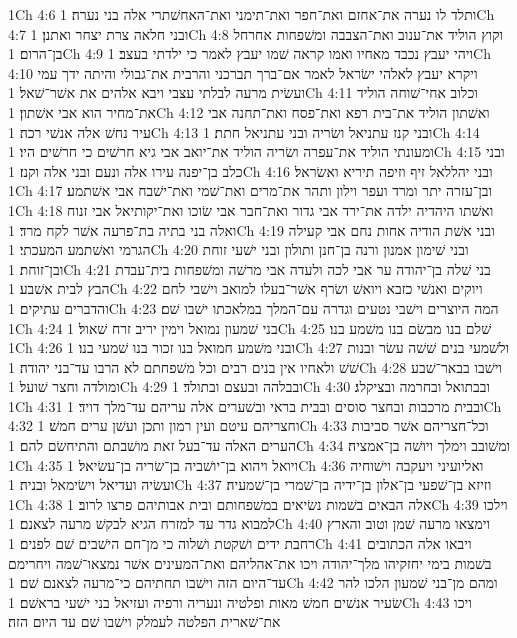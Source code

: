 1Ch 4:6  ותלד לו נערה את־אחזם ואת־חפר ואת־תימני ואת־האחשׁתרי אלה בני נערה׃
1Ch 4:7  ובני חלאה צרת יצחר ואתנן׃
1Ch 4:8  וקוץ הוליד את־ענוב ואת־הצבבה ומשׁפחות אחרחל בן־הרום׃
1Ch 4:9  ויהי יעבץ נכבד מאחיו ואמו קראה שׁמו יעבץ לאמר כי ילדתי בעצב׃
1Ch 4:10  ויקרא יעבץ לאלהי ישׂראל לאמר אם־ברך תברכני והרבית את־גבולי והיתה ידך עמי ועשׂית מרעה לבלתי עצבי ויבא אלהים את אשׁר־שׁאל׃
1Ch 4:11  וכלוב אחי־שׁוחה הוליד את־מחיר הוא אבי אשׁתון׃
1Ch 4:12  ואשׁתון הוליד את־בית רפא ואת־פסח ואת־תחנה אבי עיר נחשׁ אלה אנשׁי רכה׃
1Ch 4:13  ובני קנז עתניאל ושׂריה ובני עתניאל חתת׃
1Ch 4:14  ומעונתי הוליד את־עפרה ושׂריה הוליד את־יואב אבי גיא חרשׁים כי חרשׁים היו׃
1Ch 4:15  ובני כלב בן־יפנה עירו אלה ונעם ובני אלה וקנז׃
1Ch 4:16  ובני יהללאל זיף וזיפה תיריא ואשׂראל׃
1Ch 4:17  ובן־עזרה יתר ומרד ועפר וילון ותהר את־מרים ואת־שׁמי ואת־ישׁבח אבי אשׁתמע׃
1Ch 4:18  ואשׁתו היהדיה ילדה את־ירד אבי גדור ואת־חבר אבי שׂוכו ואת־יקותיאל אבי זנוח ואלה בני בתיה בת־פרעה אשׁר לקח מרד׃
1Ch 4:19  ובני אשׁת הודיה אחות נחם אבי קעילה הגרמי ואשׁתמע המעכתי׃
1Ch 4:20  ובני שׁימון אמנון ורנה בן־חנן ותולון ובני ישׁעי זוחת ובן־זוחת׃
1Ch 4:21  בני שׁלה בן־יהודה ער אבי לכה ולעדה אבי מרשׁה ומשׁפחות בית־עבדת הבץ לבית אשׁבע׃
1Ch 4:22  ויוקים ואנשׁי כזבא ויואשׁ ושׂרף אשׁר־בעלו למואב וישׁבי לחם והדברים עתיקים׃
1Ch 4:23  המה היוצרים וישׁבי נטעים וגדרה עם־המלך במלאכתו ישׁבו שׁם׃
1Ch 4:24  בני שׁמעון נמואל וימין יריב זרח שׁאול׃
1Ch 4:25  שׁלם בנו מבשׂם בנו משׁמע בנו׃
1Ch 4:26  ובני משׁמע חמואל בנו זכור בנו שׁמעי בנו׃
1Ch 4:27  ולשׁמעי בנים שׁשׁה עשׂר ובנות שׁשׁ ולאחיו אין בנים רבים וכל משׁפחתם לא הרבו עד־בני יהודה׃
1Ch 4:28  וישׁבו בבאר־שׁבע ומולדה וחצר שׁועל׃
1Ch 4:29  ובבלהה ובעצם ובתולד׃
1Ch 4:30  ובבתואל ובחרמה ובציקלג׃
1Ch 4:31  ובבית מרכבות ובחצר סוסים ובבית בראי ובשׁערים אלה עריהם עד־מלך דויד׃
1Ch 4:32  וחצריהם עיטם ועין רמון ותכן ועשׁן ערים חמשׁ׃
1Ch 4:33  וכל־חצריהם אשׁר סביבות הערים האלה עד־בעל זאת מושׁבתם והתיחשׂם להם׃
1Ch 4:34  ומשׁובב וימלך ויושׁה בן־אמציה׃
1Ch 4:35  ויואל ויהוא בן־יושׁביה בן־שׂריה בן־עשׂיאל׃
1Ch 4:36  ואליועיני ויעקבה וישׁוחיה ועשׂיה ועדיאל וישׂימאל ובניה׃
1Ch 4:37  וזיזא בן־שׁפעי בן־אלון בן־ידיה בן־שׁמרי בן־שׁמעיה׃
1Ch 4:38  אלה הבאים בשׁמות נשׂיאים במשׁפחותם ובית אבותיהם פרצו לרוב׃
1Ch 4:39  וילכו למבוא גדר עד למזרח הגיא לבקשׁ מרעה לצאנם׃
1Ch 4:40  וימצאו מרעה שׁמן וטוב והארץ רחבת ידים ושׁקטת ושׁלוה כי מן־חם הישׁבים שׁם לפנים׃
1Ch 4:41  ויבאו אלה הכתובים בשׁמות בימי יחזקיהו מלך־יהודה ויכו את־אהליהם ואת־המעינים אשׁר נמצאו־שׁמה ויחרימם עד־היום הזה וישׁבו תחתיהם כי־מרעה לצאנם שׁם׃
1Ch 4:42  ומהם מן־בני שׁמעון הלכו להר שׂעיר אנשׁים חמשׁ מאות ופלטיה ונעריה ורפיה ועזיאל בני ישׁעי בראשׁם׃
1Ch 4:43  ויכו את־שׁארית הפלטה לעמלק וישׁבו שׁם עד היום הזה׃
